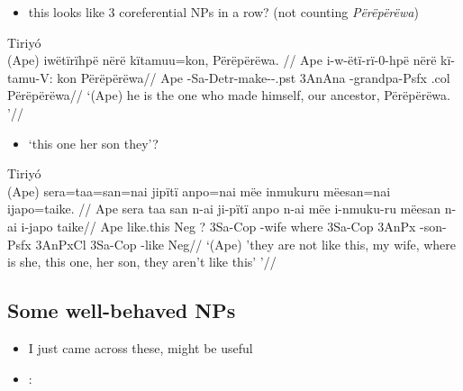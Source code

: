 \documentclass[10pt]{article}
\begin{document}
\begin{itemize}
\tightlist
\item
  this looks like 3 coreferential NPs in a row? (not counting
  \emph{Përëpërëwa})
\end{itemize}

\ex Tiriyó \\
\label{dados-09-kereramake-p-033-077}    \begingl
    \glpreamble (Ape) iwëtïrïhpë                       nërë   kïtamuu=kon,             Përëpërëwa. //
    \gla Ape i-w-ëtï-rï-0-hpë nërë kï-tamu-V: kon Përëpërëwa//
    \glb Ape -Sa-Detr-make--.pst 3AnAna -grandpa-Psfx .col Përëpërëwa//
        \glft ‘(Ape) he is the one who made himself, our ancestor, Përëpërëwa.  ’//  
    \endgl 
\xe

\begin{itemize}
\tightlist
\item
  `this one her son they'?
\end{itemize}

\ex Tiriyó \\
\label{dados-09-kereramake-p-047-363}    \begingl
    \glpreamble (Ape) sera=taa=san=nai                jipïtï    anpo=nai       mëe   inmukuru mëesan=nai       ijapo=taike. //
    \gla Ape sera taa san n-ai ji-pïtï anpo n-ai mëe i-nmuku-ru mëesan n-ai i-japo taike//
    \glb Ape like.this Neg ? 3Sa-Cop -wife where 3Sa-Cop 3AnPx -son-Psfx 3AnPxCl 3Sa-Cop -like Neg//
        \glft ‘(Ape) 'they are not like this, my wife, where is she, this one, her son, they aren't like this' ’//  
    \endgl 
\xe

\subsection{Some well-behaved NPs}

\begin{itemize}
\item
  I just came across these, might be useful
\item
   :
\end{itemize}
\end{document}
